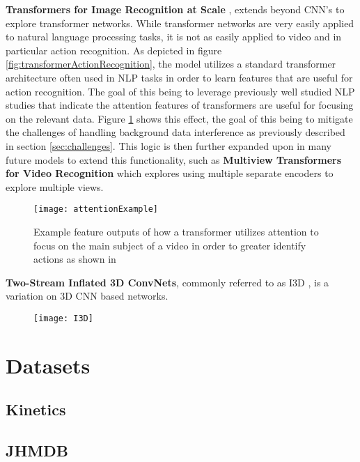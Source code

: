 \textbf{Transformers for Image Recognition at Scale} \cite{transformer_og}, extends beyond CNN's to explore transformer networks. While transformer networks are very easily applied to natural language processing tasks, it is not as easily applied to video and in particular action recognition. As depicted in figure \ref{fig:transformerActionRecognition}, the model utilizes a standard transformer architecture often used in NLP tasks in order to learn features that are useful for action recognition. The goal of this being to leverage previously well studied NLP studies that indicate the attention features of transformers are useful for focusing on the relevant data. Figure \ref{fig:attentionExample} shows this effect, the goal of this being to mitigate the challenges of handling background data interference as previously described in section \ref{sec:challenges}. This logic is then further expanded upon in many future models to extend this functionality, such as \textbf{Multiview Transformers for Video Recognition} \cite{multiview_transformers} which explores using multiple separate encoders to explore multiple views.

\begin{figure}[h]
	\texttt{[image: attentionExample]}
	\centering
	\caption{Example feature outputs of how a transformer utilizes attention to focus on the main subject of a video in order to greater identify actions as shown in \cite{transformer_og}}
	\label{fig:attentionExample}
\end{figure}

\textbf{Two-Stream Inflated 3D ConvNets}, commonly referred to as I3D \cite{i3d}, is a variation on 3D CNN based networks.

\begin{figure}[h]
	\texttt{[image: I3D]}
	\centering
\end{figure}

\section{Datasets}

\subsection{Kinetics}

\subsection{JHMDB}

